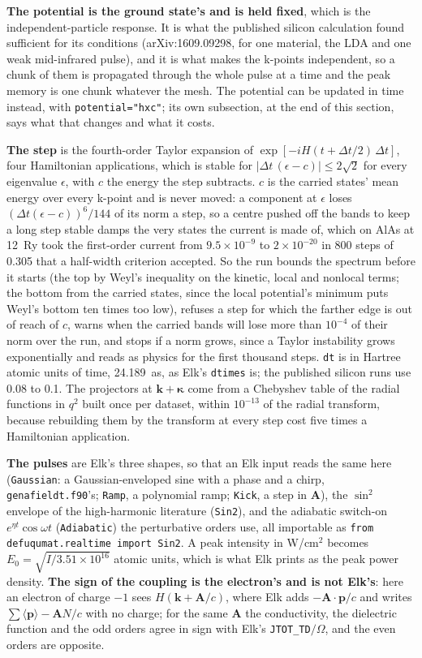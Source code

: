 \documentclass[11pt,a4paper]{article}
\newcommand{\code}[1]{\texttt{\small #1}}
\begin{document}
\textbf{The potential is the ground state's and is held fixed}, which is the
independent-particle response. It is what the published silicon calculation
found sufficient for its conditions (arXiv:1609.09298, for one material, the
LDA and one weak mid-infrared pulse), and it is what makes the k-points
independent, so a chunk of them is propagated through the whole pulse at a
time and the peak memory is one chunk whatever the mesh. The potential can be
updated in time instead, with \code{potential="hxc"}; its own subsection, at the
end of this section, says what that changes and what it costs.

\textbf{The step} is the fourth-order Taylor expansion of
$\exp[-iH(t+\Delta t/2)\,\Delta t]$, four Hamiltonian applications, which is
stable for $|\Delta t\,(\epsilon-c)| \le 2\sqrt2$ for every eigenvalue $\epsilon$,
with $c$ the energy the step subtracts. $c$ is the carried states' mean energy
over every k-point and is never moved: a component at $\epsilon$ loses
$(\Delta t(\epsilon-c))^6/144$ of its norm a step, so a centre pushed off the
bands to keep a long step stable damps the very states the current is made of,
which on AlAs at 12~Ry took the first-order current from $9.5\times10^{-9}$ to
$2\times10^{-20}$ in 800 steps of 0.305 that a half-width criterion accepted. So
the run bounds the spectrum before it starts (the top by Weyl's inequality on the
kinetic, local and nonlocal terms; the bottom from the carried states, since the
local potential's minimum puts Weyl's bottom ten times too low), refuses a step
for which the farther edge is out of reach of $c$, warns when the carried bands
will lose more than $10^{-4}$ of their norm over the run, and stops if a norm
grows, since a Taylor instability grows exponentially and reads as physics for
the first thousand steps. \code{dt} is in Hartree atomic units of time, 24.189~as, as Elk's
\code{dtimes} is; the published silicon runs use 0.08 to 0.1. The projectors at
$\mathbf k+\boldsymbol\kappa$ come from a Chebyshev table of the radial
functions in $q^2$ built once per dataset, within $10^{-13}$ of the radial
transform, because rebuilding them by the transform at every step cost five
times a Hamiltonian application.

\textbf{The pulses} are Elk's three shapes, so that an Elk input reads the same
here (\code{Gaussian}: a Gaussian-enveloped sine with a phase and a chirp,
\code{genafieldt.f90}'s; \code{Ramp}, a polynomial ramp; \code{Kick}, a step in
$\mathbf A$), the $\sin^2$ envelope of the high-harmonic literature
(\code{Sin2}), and the adiabatic switch-on $e^{\eta t}\cos\omega t$
(\code{Adiabatic}) the perturbative orders use, all importable as
\code{from defuqumat.realtime import Sin2}. A peak intensity in W/cm$^2$ becomes
$E_0 = \sqrt{I/3.51\times10^{16}}$ atomic units, which is what Elk prints as the
peak power density. \textbf{The sign of the coupling is the electron's and is not
Elk's}: here an electron of charge $-1$ sees $H(\mathbf k+\mathbf A/c)$, where
Elk adds $-\mathbf A\cdot\mathbf p/c$ and writes $\sum\langle\mathbf p\rangle -
\mathbf A N/c$ with no charge; for the same $\mathbf A$ the conductivity, the
dielectric function and the odd orders agree in sign with Elk's
\code{JTOT\_TD}$/\Omega$, and the even orders are opposite.
\end{document}
